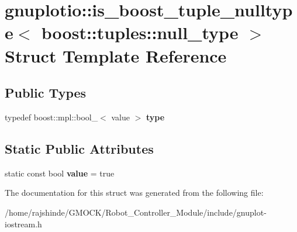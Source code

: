 \hypertarget{structgnuplotio_1_1is__boost__tuple__nulltype_3_01boost_1_1tuples_1_1null__type_01_4}{}\section{gnuplotio\+:\+:is\+\_\+boost\+\_\+tuple\+\_\+nulltype$<$ boost\+:\+:tuples\+:\+:null\+\_\+type $>$ Struct Template Reference}
\label{structgnuplotio_1_1is__boost__tuple__nulltype_3_01boost_1_1tuples_1_1null__type_01_4}
\subsection*{Public Types}
\begin{DoxyCompactItemize}
\item 
typedef boost\+::mpl\+::bool\+\_\+$<$ value $>$ {\bfseries type}\hypertarget{structgnuplotio_1_1is__boost__tuple__nulltype_3_01boost_1_1tuples_1_1null__type_01_4_aab5c47dbae2148f1e9ed4d89f25f21fd}{}\label{structgnuplotio_1_1is__boost__tuple__nulltype_3_01boost_1_1tuples_1_1null__type_01_4_aab5c47dbae2148f1e9ed4d89f25f21fd}

\end{DoxyCompactItemize}
\subsection*{Static Public Attributes}
\begin{DoxyCompactItemize}
\item 
static const bool {\bfseries value} = true\hypertarget{structgnuplotio_1_1is__boost__tuple__nulltype_3_01boost_1_1tuples_1_1null__type_01_4_ae7fc5c63a7b01851c7ce12dbf634cfea}{}\label{structgnuplotio_1_1is__boost__tuple__nulltype_3_01boost_1_1tuples_1_1null__type_01_4_ae7fc5c63a7b01851c7ce12dbf634cfea}

\end{DoxyCompactItemize}


The documentation for this struct was generated from the following file\+:\begin{DoxyCompactItemize}
\item 
/home/rajshinde/\+G\+M\+O\+C\+K/\+Robot\+\_\+\+Controller\+\_\+\+Module/include/gnuplot-\/iostream.\+h\end{DoxyCompactItemize}
